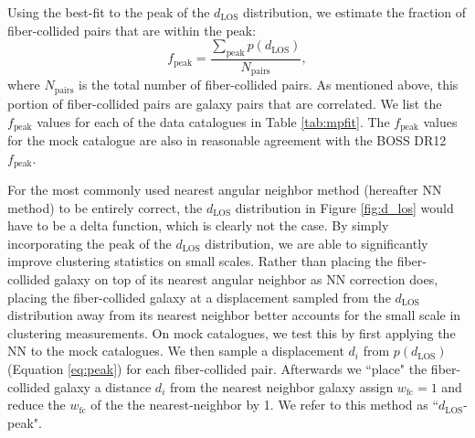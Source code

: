 \documentclass{emulateapj}
\begin{document}
Using the best-fit to the peak of the $d_{\mathrm{LOS}}$ distribution, we estimate the fraction of fiber-collided pairs that are within the peak: 
\begin{equation}
f_{\mathrm{peak}} = \frac{\sum\limits_{\mathrm{peak}} p(d_{\mathrm{LOS}})}{N_{\mathrm{pairs}}}, 
\end{equation}
where $N_{\mathrm{pairs}}$ is the total number of fiber-collided pairs. As mentioned above, this portion of fiber-collided pairs are galaxy pairs that are correlated. We list the $f_{\mathrm{peak}}$ values for each of the data catalogues in Table \ref{tab:mpfit}. The $f_\mathrm{peak}$ values for the mock catalogue are also in reasonable agreement with the BOSS DR12 $f_\mathrm{peak}$. 

For the most commonly used nearest angular neighbor method (hereafter NN method) to be entirely correct, the $d_{\mathrm{LOS}}$ distribution in Figure \ref{fig:d_los} would have to be a delta function, which is clearly not the case. By simply incorporating the peak of the $d_{\mathrm{LOS}}$ distribution, we are able to significantly improve clustering statistics on small scales. Rather than placing the fiber-collided galaxy on top of its nearest angular neighbor as NN correction does, placing the fiber-collided galaxy at a displacement sampled from the $d_{\mathrm{LOS}}$ distribution away from its nearest neighbor better accounts for the small scale in clustering measurements. On mock catalogues, we test this by first applying the NN to the mock catalogues. We then sample a displacement $d_i$ from $p(d_\mathrm{LOS})$ (Equation \ref{eq:peak}) for each fiber-collided pair. Afterwards we ``place" the fiber-collided galaxy a distance $d_i$ from the nearest neighbor galaxy assign $w_\mathrm{fc} = 1$ and reduce the $w_\mathrm{fc}$ of the the nearest-neighbor by 1. We refer to this method as ``$d_\mathrm{LOS}$-peak". 
\end{document}
